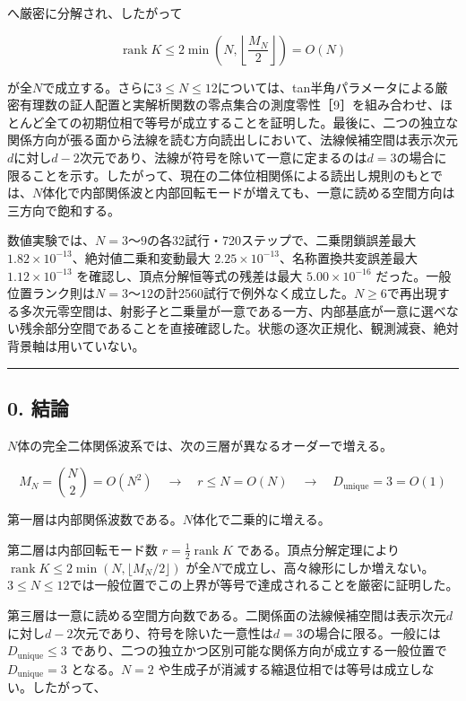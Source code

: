 \documentclass[
  a4paper,
]{ltjsarticle}
\begin{document}
へ厳密に分解され、したがって

\[
\operatorname{rank}K\le 2\min\!\left(N,\left\lfloor\frac{M_N}{2}\right\rfloor\right)=O(N)
\]

が全\(N\)で成立する。さらに\(3\le N\le12\)については、tan半角パラメータによる厳密有理数の証人配置と実解析関数の零点集合の測度零性［9］を組み合わせ、ほとんど全ての初期位相で等号が成立することを証明した。最後に、二つの独立な関係方向が張る面から法線を読む方向読出しにおいて、法線候補空間は表示次元\(d\)に対し\(d-2\)次元であり、法線が符号を除いて一意に定まるのは\(d=3\)の場合に限ることを示す。したがって、現在の二体位相関係による読出し規則のもとでは、\(N\)体化で内部関係波と内部回転モードが増えても、一意に読める空間方向は三方向で飽和する。

数値実験では、\(N=3\)〜\(9\)の各32試行・720ステップで、二乗閉鎖誤差最大
\(1.82\times10^{-13}\)、絶対値二乗和変動最大
\(2.25\times10^{-13}\)、名称置換共変誤差最大 \(1.12\times10^{-13}\)
を確認し、頂点分解恒等式の残差は最大 \(5.00\times10^{-16}\)
だった。一般位置ランク則は\(N=3\)〜\(12\)の計2560試行で例外なく成立した。\(N\ge6\)で再出現する多次元零空間は、射影子と二乗量が一意である一方、内部基底が一意に選べない残余部分空間であることを直接確認した。状態の逐次正規化、観測減衰、絶対背景軸は用いていない。

\begin{center}\rule{0.5\linewidth}{0.5pt}\end{center}

\subsection{0. 結論}\label{ux7d50ux8ad6}

\(N\)体の完全二体関係波系では、次の三層が異なるオーダーで増える。

\[
\boxed{
M_N=\binom{N}{2}=O(N^2)
\quad\longrightarrow\quad
r\le N=O(N)
\quad\longrightarrow\quad
D_{\mathrm{unique}}=3=O(1)
}
\]

第一層は内部関係波数である。\(N\)体化で二乗的に増える。

第二層は内部回転モード数 \(r=\frac12\operatorname{rank}K\)
である。頂点分解定理により
\(\operatorname{rank}K\le2\min(N,\lfloor M_N/2\rfloor)\)
が全\(N\)で成立し、高々線形にしか増えない。\(3\le N\le12\)では一般位置でこの上界が等号で達成されることを厳密に証明した。

第三層は一意に読める空間方向数である。二関係面の法線候補空間は表示次元\(d\)に対し\(d-2\)次元であり、符号を除いた一意性は\(d=3\)の場合に限る。一般には
\(D_{\mathrm{unique}}\le3\)
であり、二つの独立かつ区別可能な関係方向が成立する一般位置で
\(D_{\mathrm{unique}}=3\) となる。\(N=2\)
や生成子が消滅する縮退位相では等号は成立しない。したがって、
\end{document}
